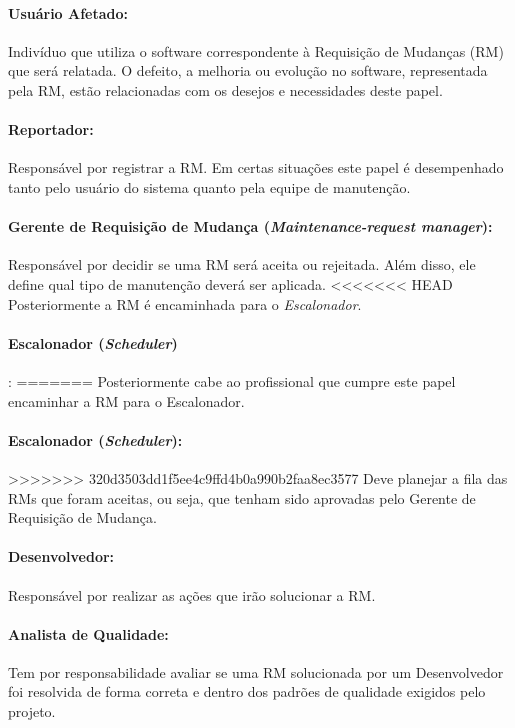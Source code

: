 \paragraph{Usuário Afetado:}
Indivíduo que utiliza o software correspondente à Requisição de Mudanças (RM)
que será relatada. O defeito, a melhoria ou evolução no software, representada
pela RM, estão relacionadas com os desejos e necessidades deste papel.

\paragraph{Reportador:}
Responsável por registrar a RM\@. Em certas situações este papel é desempenhado
tanto pelo usuário do sistema quanto pela equipe de manutenção.

\paragraph{Gerente de Requisição de Mudança (\textit{Maintenance-request
        manager}):} Res\-pon\-sá\-vel por decidir se uma RM será aceita ou
rejeitada. Além disso, ele define qual tipo de manutenção deverá ser aplicada.
<<<<<<< HEAD
Posteriormente a RM é encaminhada para o \textit{Escalonador}.

\paragraph{Escalonador (\textit{Scheduler})}:
=======
Posteriormente cabe ao profissional que cumpre este papel encaminhar a RM para
o Escalonador.

\paragraph{Escalonador (\textit{Scheduler}):}
>>>>>>> 320d3503dd1f5ee4c9ffd4b0a990b2faa8ec3577
Deve planejar a fila das RMs que foram aceitas, ou seja, que tenham sido
aprovadas pelo Gerente de Requisição de Mudança.

\paragraph{Desenvolvedor:}
Responsável por realizar as ações que irão solucionar a RM\@.

\paragraph{Analista de Qualidade:}
Tem por responsabilidade avaliar se uma RM solucionada por um Desenvolvedor foi
resolvida de forma correta e dentro dos padrões de qualidade exigidos pelo
projeto.

